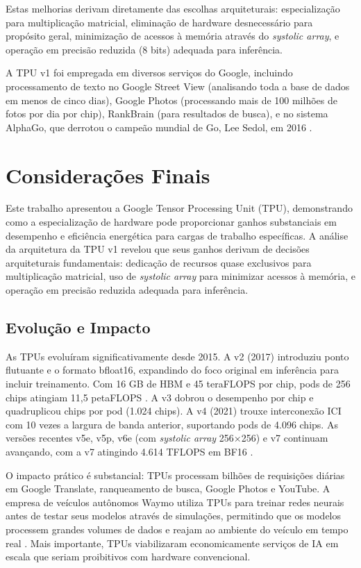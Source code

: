 \documentclass[12pt,a4paper]{article}
\begin{document}
Estas melhorias derivam diretamente das escolhas arquiteturais: especialização para multiplicação matricial, eliminação de hardware desnecessário para propósito geral, minimização de acessos à memória através do \textit{systolic array}, e operação em precisão reduzida (8 bits) adequada para inferência.

A TPU v1 foi empregada em diversos serviços do Google, incluindo processamento de texto no Google Street View (analisando toda a base de dados em menos de cinco dias), Google Photos (processando mais de 100 milhões de fotos por dia por chip), RankBrain (para resultados de busca), e no sistema AlphaGo, que derrotou o campeão mundial de Go, Lee Sedol, em 2016 \cite{wikipedia_tpu_2024}.

\section{Considerações Finais}

Este trabalho apresentou a Google Tensor Processing Unit (TPU), demonstrando como a especialização de hardware pode proporcionar ganhos substanciais em desempenho e eficiência energética para cargas de trabalho específicas. A análise da arquitetura da TPU v1 revelou que seus ganhos derivam de decisões arquiteturais fundamentais: dedicação de recursos quase exclusivos para multiplicação matricial, uso de \textit{systolic array} para minimizar acessos à memória, e operação em precisão reduzida adequada para inferência.

\subsection{Evolução e Impacto}

As TPUs evoluíram significativamente desde 2015. A v2 (2017) introduziu ponto flutuante e o formato bfloat16, expandindo do foco original em inferência para incluir treinamento. Com 16 GB de HBM e 45 teraFLOPS por chip, pods de 256 chips atingiam 11,5 petaFLOPS \cite{wikipedia_tpu_v2}. A v3 dobrou o desempenho por chip e quadruplicou chips por pod (1.024 chips). A v4 (2021) trouxe interconexão ICI com 10 vezes a largura de banda anterior, suportando pods de 4.096 chips. As versões recentes v5e, v5p, v6e (com \textit{systolic array} 256×256) e v7 continuam avançando, com a v7 atingindo 4.614 TFLOPS em BF16 \cite{techplanet_tpu_2024}.

O impacto prático é substancial: TPUs processam bilhões de requisições diárias em Google Translate, ranqueamento de busca, Google Photos e YouTube. A empresa de veículos autônomos Waymo utiliza TPUs para treinar redes neurais antes de testar seus modelos através de simulações, permitindo que os modelos processem grandes volumes de dados e reajam ao ambiente do veículo em tempo real \cite{builtin_tpu_2024}. Mais importante, TPUs viabilizaram economicamente serviços de IA em escala que seriam proibitivos com hardware convencional.
\end{document}
